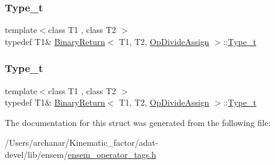 \mbox{\label{structBinaryReturn_3_01T1_00_01T2_00_01OpDivideAssign_01_4_adc3c915034f321213a7e76979b881a0d}} 
\subsubsection{\texorpdfstring{Type\_t}{Type\_t}\hspace{0.1cm}{\footnotesize\ttfamily [2/3]}}
{\footnotesize\ttfamily template$<$class T1 , class T2 $>$ \\
typedef T1\& \mbox{\hyperlink{structBinaryReturn}{Binary\+Return}}$<$ T1, T2, \mbox{\hyperlink{structOpDivideAssign}{Op\+Divide\+Assign}} $>$\+::\mbox{\hyperlink{structBinaryReturn_3_01T1_00_01T2_00_01OpDivideAssign_01_4_adc3c915034f321213a7e76979b881a0d}{Type\+\_\+t}}}

\mbox{\label{structBinaryReturn_3_01T1_00_01T2_00_01OpDivideAssign_01_4_adc3c915034f321213a7e76979b881a0d}} 
\subsubsection{\texorpdfstring{Type\_t}{Type\_t}\hspace{0.1cm}{\footnotesize\ttfamily [3/3]}}
{\footnotesize\ttfamily template$<$class T1 , class T2 $>$ \\
typedef T1\& \mbox{\hyperlink{structBinaryReturn}{Binary\+Return}}$<$ T1, T2, \mbox{\hyperlink{structOpDivideAssign}{Op\+Divide\+Assign}} $>$\+::\mbox{\hyperlink{structBinaryReturn_3_01T1_00_01T2_00_01OpDivideAssign_01_4_adc3c915034f321213a7e76979b881a0d}{Type\+\_\+t}}}



The documentation for this struct was generated from the following file\+:\begin{DoxyCompactItemize}
\item 
/\+Users/archanar/\+Kinematic\+\_\+factor/adat-\/devel/lib/ensem/\mbox{\hyperlink{adat-devel_2lib_2ensem_2ensem__operator__tags_8h}{ensem\+\_\+operator\+\_\+tags.\+h}}\end{DoxyCompactItemize}
